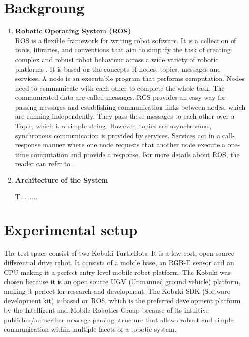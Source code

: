 \documentclass[journal]{IEEEtran}
\begin{document}
\section{Backgroung}
\begin{enumerate}
\item \textbf{Robotic Operating System (ROS)}\\
ROS is a flexible framework for writing robot software. It is a collection of tools, libraries, and conventions that aim to simplify the task of creating complex and robust robot behaviour across a wide variety of robotic platforms . It is based on the concepts of nodes, topics, messages and services. A node is an executable program that performs computation. Nodes need to communicate with each other to complete the whole task. The communicated data are called messages. ROS provides an easy way for passing messages and establishing communication links between nodes, which are running independently. They pass these messages to each other over a Topic, which is a simple string. However, topics are asynchronous, synchronous communication is provided by services. Services act in a call-response manner where one node requests that another node execute a one-time computation and provide a response. For more details about ROS, the reader can refer to \cite{temp2}.



\item \textbf{Architecture of the System}

T.........

\end{enumerate}


\section{Experimental setup}

The test space consist of two Kobuki TurtleBots. It is a low-cost, open source differential drive robot. It consists of a mobile base, an RGB-D sensor and an CPU making it a perfect entry-level mobile robot platform. The Kobuki was chosen because it is an open source UGV (Unmanned ground vehicle) platform, making it perfect for research and development. The Kobuki SDK (Software development kit) is based on ROS, which is the preferred development platform by the Intelligent and Mobile Robotics Group because of its intuitive publisher/subscriber message passing structure that allows robust and simple communication within multiple facets of a robotic system.
\end{document}

